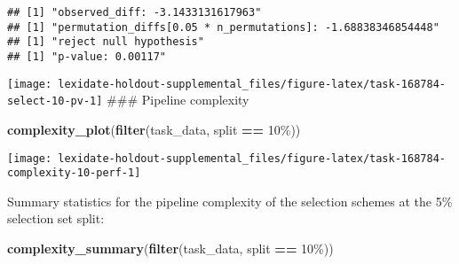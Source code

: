 \documentclass[
]{book}
\newenvironment{Shaded}{\begin{snugshade}}{\end{snugshade}}
\newcommand{\AttributeTok}[1]{\textcolor[rgb]{0.13,0.29,0.53}{#1}}
\newcommand{\DecValTok}[1]{\textcolor[rgb]{0.00,0.00,0.81}{#1}}
\newcommand{\FunctionTok}[1]{\textcolor[rgb]{0.13,0.29,0.53}{\textbf{#1}}}
\newcommand{\NormalTok}[1]{#1}
\newcommand{\OtherTok}[1]{\textcolor[rgb]{0.56,0.35,0.01}{#1}}
\newcommand{\SpecialCharTok}[1]{\textcolor[rgb]{0.81,0.36,0.00}{\textbf{#1}}}
\newcommand{\StringTok}[1]{\textcolor[rgb]{0.31,0.60,0.02}{#1}}
\begin{document}
\begin{Shaded}
\end{Shaded}

\begin{verbatim}
## [1] "observed_diff: -3.1433131617963"
## [1] "permutation_diffs[0.05 * n_permutations]: -1.68838346854448"
## [1] "reject null hypothesis"
## [1] "p-value: 0.00117"
\end{verbatim}

\texttt{[image: lexidate-holdout-supplemental\_files/figure-latex/task-168784-select-10-pv-1]}
\#\#\# Pipeline complexity

\begin{Shaded}
\begin{Highlighting}[]
\FunctionTok{complexity\_plot}\NormalTok{(}\FunctionTok{filter}\NormalTok{(task\_data, split }\SpecialCharTok{==} \StringTok{\textquotesingle{}10\%\textquotesingle{}}\NormalTok{))}
\end{Highlighting}
\end{Shaded}

\texttt{[image: lexidate-holdout-supplemental\_files/figure-latex/task-168784-complexity-10-perf-1]}

Summary statistics for the pipeline complexity of the selection schemes at the 5\% selection set split:

\begin{Shaded}
\begin{Highlighting}[]
\FunctionTok{complexity\_summary}\NormalTok{(}\FunctionTok{filter}\NormalTok{(task\_data, split }\SpecialCharTok{==} \StringTok{\textquotesingle{}10\%\textquotesingle{}}\NormalTok{))}
\end{Highlighting}
\end{Shaded}
\end{document}
